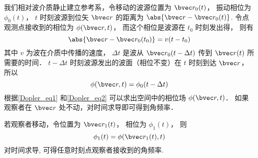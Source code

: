 

我们相对波介质静止建立参考系，令移动的波源位置为 $\bvec r_0(t)$， 振动相位为 $\phi_0(t)$， $t$ 时刻波源到位矢 $\bvec r$ 的距离为 $\abs{\bvec r - \bvec r_0(t)}$. 令点观测点接收到的相位为 $\phi(\bvec r, t)$， 而这个相位是波源在 $t_0$ 时刻发出得， 则有
\begin{equation}\label{Dopler_eq1}
\abs{\bvec r - \bvec r_0(t_0)} = v(t - t_0)
\end{equation}
其中 $v$ 为波在介质中传播的速度， $\Delta t$ 是波从 $\bvec r_0(t - \Delta t)$ 传到 $\bvec r(t)$ 所需要的时间． $t - \Delta t$ 时刻波源发出的波面（相位不变）在 $t$ 时刻到达 $\bvec r$， 所以
\begin{equation}\label{Dopler_eq2}
\phi(\bvec r, t) = \phi_0(t - \Delta t)
\end{equation}
根据\autoref{Dopler_eq1} 和\autoref{Dopler_eq2} 可以求出空间中的相位场 $\phi(\bvec r, t)$． 如果观察者在 $\bvec r$ 处不动，对时间求导即可得到角频率．

若观察者移动，令位置为 $\bvec r_1(t)$， 相位为 $\phi_1(t)$， 则
\begin{equation}
\phi_1(t) = \phi(\bvec r_1(t), t)
\end{equation}
对时间求导, 可得任意时刻点观察者接收到的角频率.


